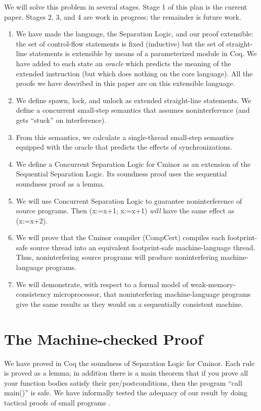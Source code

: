 \documentclass{llncs}
\newcommand{\cminor}{Cminor}
\newcommand{\compcert}{CompCert}
\begin{document}
We will solve this problem in several stages.
Stage 1 of this plan is the current paper.
Stages 2, 3, and 4 are work in progress; 
the remainder is future work.
\begin{enumerate}
\item We have made the language, the Separation Logic, and our proof
extensible: the set of control-flow statements is fixed (inductive) but
the set of straight-line statements is extensible
by means of a parameterized module in Coq.  We have added to each state
 an \emph{oracle} which predicts the meaning of the extended
instruction (but which does nothing on the core language).  All the proofs we
have described in this paper are on this extensible language.
\item 
\label{contrib1}
We define spawn, lock, and unlock as extended straight-line statements.  We define a 
concurrent small-step semantics that 
assumes noninterference 
(and gets ``stuck'' on interference).
\item From this semantics, we calculate
a single-thread small-step semantics equip\-ped with
the oracle that predicts the effects of synchronizations.
\item We define a Concurrent Separation Logic for \cminor{}
as an extension of the Sequential Separation Logic.
Its soundness proof uses the sequential soundness proof
as a lemma.
\item We will use 
Concurrent Separation Logic to guarantee noninterference
of source programs.  Then
(x:=x+1; x:=x+1) \emph{will} have the same effect as
(x:=x+2).
\item We will prove that the \cminor{} compiler (\compcert{})
compiles each
footprint-safe source thread into an equivalent 
footprint-safe machine-language thread.  Thus, noninterfering source
programs will produce noninterfering machine-language programs.
\item We will demonstrate, with respect to a formal model
of weak-memory-consistency microprocessor, that 
noninterfering machine-language programs give the same results as they
would on a sequentially consistent machine.
\end{enumerate}
\vspace{-13pt}

\section{The Machine-checked Proof}
We have proved in Coq the soundness of Separation Logic for \cminor{}.
Each rule is proved as a lemma; in addition there is a main theorem
that if you prove all your function bodies satisfy their pre/postconditions,
then the program ``call main()'' is safe.
We have informally tested the adequacy of our result by doing tactical proofs
of small programs \cite{appel06:septacs}.  
\end{document}
